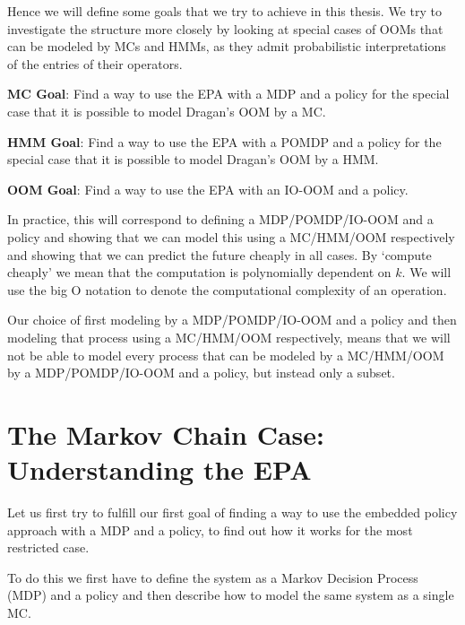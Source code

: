 \documentclass{article}
\theoremstyle{definition}
\begin{document}
Hence we will define some goals that we try to achieve in this thesis. We try to investigate the structure more closely by looking at special cases of OOMs that can be modeled by MCs and HMMs, as they admit probabilistic interpretations of the entries of their operators. 
\begin{description}
\item{\textbf{MC Goal}:} \label{mcgoal} Find  a way to use the EPA with a MDP and a policy for the special case that it is possible to model Dragan's OOM by a MC. 
\item{\textbf{HMM Goal}:} \label{hmmgoal} Find a way to use the EPA with a POMDP and a policy for the special case that it is possible to model Dragan's OOM by a HMM.
\item{\textbf{OOM Goal}:} \label{oomgoal} Find a way to use the EPA with an IO-OOM and a
  policy.
\end{description}
In practice, this will correspond to defining a MDP/POMDP/IO-OOM and a policy and showing that we can model this using a MC/HMM/OOM respectively and showing that we can predict the future cheaply in all cases. By `compute cheaply' we mean that the computation is polynomially dependent on $k$. We will use the big O notation to denote the computational complexity of an operation.

Our choice of first modeling by a MDP/POMDP/IO-OOM and a policy and then modeling that process using a MC/HMM/OOM respectively, means that we will not be able to model every process that can be modeled by a MC/HMM/OOM by a MDP/POMDP/IO-OOM and a policy, but instead only a subset. 

\section{The Markov Chain Case: Understanding the EPA}\label{sec:MC} 
Let us first try to fulfill our first goal of finding a way to use the embedded policy approach with a MDP and a policy, to find out how it works for the most restricted case. 

To do this we first have to define the system as a Markov Decision Process (MDP) and a policy and then describe how to model the same system as a single MC. 
\end{document}
